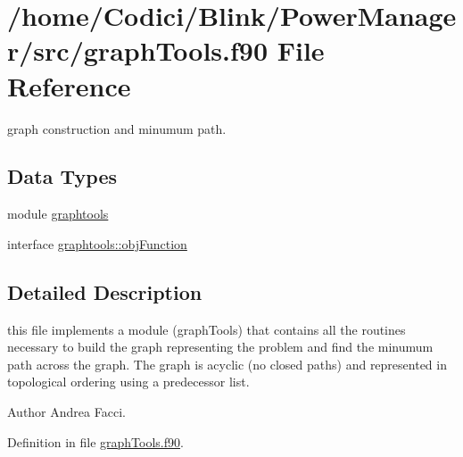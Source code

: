\hypertarget{graph_tools_8f90}{\section{/home/\-Codici/\-Blink/\-Power\-Manager/src/graph\-Tools.f90 File Reference}
\label{graph_tools_8f90}
}


graph construction and minumum path.  


\subsection*{Data Types}
\begin{DoxyCompactItemize}
\item 
module \hyperlink{classgraphtools}{graphtools}
\item 
interface \hyperlink{interfacegraphtools_1_1obj_function}{graphtools\-::obj\-Function}
\end{DoxyCompactItemize}


\subsection{Detailed Description}
this file implements a module (graph\-Tools) that contains all the routines necessary to build the graph representing the problem and find the minumum path across the graph. The graph is acyclic (no closed paths) and represented in topological ordering using a predecessor list. \begin{DoxyAuthor}{Author}
Andrea Facci. 
\end{DoxyAuthor}


Definition in file \hyperlink{graph_tools_8f90_source}{graph\-Tools.\-f90}.

